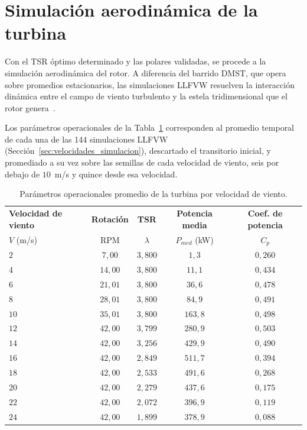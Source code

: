 \section{Simulación aerodinámica de la turbina}
\label{sec:curva_potencia}

Con el TSR óptimo determinado y las polares validadas, se procede a la simulación aerodinámica del rotor. A diferencia del barrido DMST, que opera sobre promedios estacionarios, las simulaciones LLFVW resuelven la interacción dinámica entre el campo de viento turbulento y la estela tridimensional que el rotor genera~\parencite{marten2019qblade}.

Los parámetros operacionales de la Tabla~\ref{tab:curva_potencia} corresponden al promedio temporal de cada una de las 144 simulaciones LLFVW (Sección~\ref{sec:velocidades_simulacion}), descartado el transitorio inicial, y promediado a su vez sobre las semillas de cada velocidad de viento, seis por debajo de $10$~m/s y quince desde esa velocidad.

\begin{table}[H]
    \centering
    \caption[Parámetros operacionales promedio de la turbina.]{Parámetros operacionales promedio de la turbina por velocidad de viento.}
    \label{tab:curva_potencia}
    \begin{tabular}{lcccc}
        \hline
        \textbf{Velocidad de viento} & \textbf{Rotación} & \textbf{TSR} & \textbf{Potencia media} & \textbf{Coef. de potencia} \\
        $V$ (m/s) & RPM & $\lambda$ & $P_{med}$ (kW) & $C_{p}$ \\
        \hline
        $2$ & $7{,}00$ & $3{,}800$ & $1{,}3$ & $0{,}260$ \\
        $4$ & $14{,}00$ & $3{,}800$ & $11{,}1$ & $0{,}434$ \\
        $6$ & $21{,}01$ & $3{,}800$ & $36{,}6$ & $0{,}478$ \\
        $8$ & $28{,}01$ & $3{,}800$ & $84{,}9$ & $0{,}491$ \\
        $10$ & $35{,}01$ & $3{,}800$ & $163{,}8$ & $0{,}498$ \\
        $12$ & $42{,}00$ & $3{,}799$ & $280{,}9$ & $0{,}503$ \\
        $14$ & $42{,}00$ & $3{,}256$ & $429{,}9$ & $0{,}490$ \\
        $16$ & $42{,}00$ & $2{,}849$ & $511{,}7$ & $0{,}394$ \\
        $18$ & $42{,}00$ & $2{,}533$ & $491{,}6$ & $0{,}268$ \\
        $20$ & $42{,}00$ & $2{,}279$ & $437{,}6$ & $0{,}175$ \\
        $22$ & $42{,}00$ & $2{,}072$ & $396{,}9$ & $0{,}119$ \\
        $24$ & $42{,}00$ & $1{,}899$ & $378{,}9$ & $0{,}088$ \\
        \hline
    \end{tabular}
\end{table}

